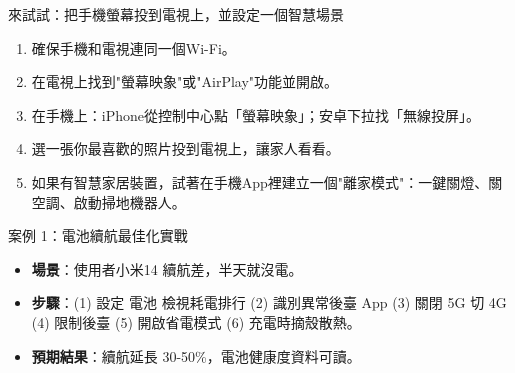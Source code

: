 \begin{tcbpractice}{來試試：把手機螢幕投到電視上，並設定一個智慧場景}
\begin{enumerate}
  \item 確保手機和電視連同一個Wi-Fi。
  \item 在電視上找到"螢幕映象"或"AirPlay"功能並開啟。
  \item 在手機上：iPhone從控制中心點「螢幕映象」；安卓下拉找「無線投屏」。
  \item 選一張你最喜歡的照片投到電視上，讓家人看看。
  \item 如果有智慧家居裝置，試著在手機App裡建立一個"離家模式"：一鍵關燈、關空調、啟動掃地機器人。
\end{enumerate}

\end{tcbpractice}

\begin{tcbinfo}{案例 1：電池續航最佳化實戰}
\begin{itemize}
  \item \textbf{場景}：使用者小米14 續航差，半天就沒電。
  \item \textbf{步驟}：(1) 設定 電池 檢視耗電排行 (2) 識別異常後臺 App (3) 關閉 5G 切 4G (4) 限制後臺 (5) 開啟省電模式 (6) 充電時摘殼散熱。
  \item \textbf{預期結果}：續航延長 30-50\%，電池健康度資料可讀。
\end{itemize}

\end{tcbinfo}
